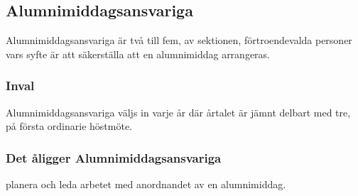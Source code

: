 \subsection{Alumnimiddagsansvariga}
Alumnimiddagsansvariga är två till fem, av sektionen, förtroendevalda personer vars syfte är att säkerställa att en alumnimiddag arrangeras.

\subsubsection{Inval}
Alumnimiddagsansvariga väljs in varje år där årtalet är jämnt delbart med tre, på första ordinarie höstmöte.  

\subsubsection{Det åligger Alumnimiddagsansvariga}
\begin{att}
  \item planera och leda arbetet med anordnandet av en alumnimiddag.
\end{att}